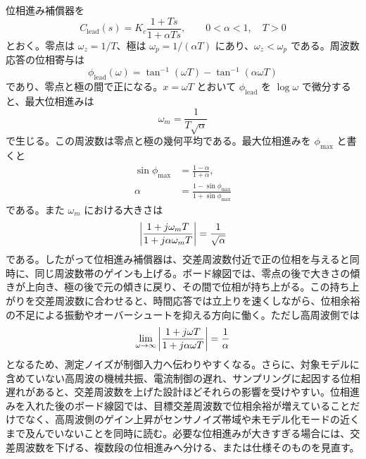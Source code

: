 位相進み補償器を
\begin{equation}
  C_{\mathrm{lead}}(s)
  =K_c\frac{1+Ts}{1+\alpha Ts},
  \qquad 0<\alpha<1,\quad T>0
\end{equation}
とおく。零点は $\omega_z=1/T$、極は $\omega_p=1/(\alpha T)$ にあり、$\omega_z<\omega_p$ である。周波数応答の位相寄与は
\begin{equation}
  \phi_{\mathrm{lead}}(\omega)
  =\tan^{-1}(\omega T)-\tan^{-1}(\alpha\omega T)
\end{equation}
であり、零点と極の間で正になる。$x=\omega T$ とおいて $\phi_{\mathrm{lead}}$ を $\log \omega$ で微分すると、最大位相進みは
\begin{equation}
  \omega_m=\frac{1}{T\sqrt{\alpha}}
\end{equation}
で生じる。この周波数は零点と極の幾何平均である。最大位相進みを $\phi_{\max}$ と書くと
\begin{align}
  \sin\phi_{\max}
  &=\frac{1-\alpha}{1+\alpha},\\
  \alpha
  &=\frac{1-\sin\phi_{\max}}{1+\sin\phi_{\max}}
\end{align}
である。また $\omega_m$ における大きさは
\begin{equation}
  \left|\frac{1+j\omega_m T}{1+j\alpha\omega_m T}\right|
  =\frac{1}{\sqrt{\alpha}}
\end{equation}
である。したがって位相進み補償器は、交差周波数付近で正の位相を与えると同時に、同じ周波数帯のゲインも上げる。ボード線図では、零点の後で大きさの傾きが上向き、極の後で元の傾きに戻り、その間で位相が持ち上がる。この持ち上がりを交差周波数に合わせると、時間応答では立上りを速くしながら、位相余裕の不足による振動やオーバーシュートを抑える方向に働く。ただし高周波側では
\begin{equation}
  \lim_{\omega\to\infty}
  \left|\frac{1+j\omega T}{1+j\alpha\omega T}\right|
  =\frac{1}{\alpha}
\end{equation}
となるため、測定ノイズが制御入力へ伝わりやすくなる。さらに、対象モデルに含めていない高周波の機械共振、電流制御の遅れ、サンプリングに起因する位相遅れがあると、交差周波数を上げた設計ほどそれらの影響を受けやすい。位相進みを入れた後のボード線図では、目標交差周波数で位相余裕が増えていることだけでなく、高周波側のゲイン上昇がセンサノイズ帯域や未モデル化モードの近くまで及んでいないことを同時に読む。必要な位相進みが大きすぎる場合には、交差周波数を下げる、複数段の位相進みへ分ける、または仕様そのものを見直す。

